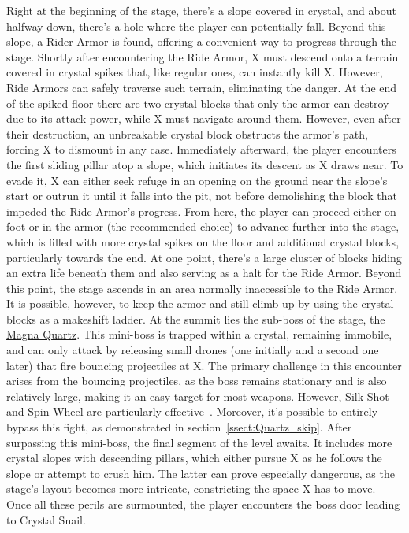 Right at the beginning of the stage, there's a slope covered in crystal, and about halfway down, there's a hole where the player can potentially fall. Beyond this slope, a Rider Armor is found, offering a convenient way to progress through the stage. Shortly after encountering the Ride Armor, X must descend onto a terrain covered in crystal spikes that, like regular ones, can instantly kill X. However, Ride Armors can safely traverse such terrain, eliminating the danger. At the end of the spiked floor there are two crystal blocks that only the armor can destroy due to its attack power, while X must navigate around them. However, even after their destruction, an unbreakable crystal block obstructs the armor's path, forcing X to dismount in any case. Immediately afterward, the player encounters the first sliding pillar atop a slope, which initiates its descent as X draws near. To evade it, X can either seek refuge in an opening on the ground near the slope's start or outrun it until it falls into the pit, not before demolishing the block that impeded the Ride Armor's progress. From here, the player can proceed either on foot or in the armor (the recommended choice) to advance further into the stage, which is filled with more crystal spikes on the floor and additional crystal blocks, particularly towards the end. At one point, there's a large cluster of blocks hiding an extra life beneath them and also serving as a halt for the Ride Armor. Beyond this point, the stage ascends in an area normally inaccessible to the Ride Armor. It is possible, however, to keep the armor and still climb up by using the crystal blocks as a makeshift ladder. At the summit lies the sub-boss of the stage, the \hyperlink{miniboss:Magna_Quartz}{Magna Quartz}. This mini-boss is trapped within a crystal, remaining immobile, and can only attack by releasing small drones (one initially and a second one later) that fire bouncing projectiles at X. The primary challenge in this encounter arises from the bouncing projectiles, as the boss remains stationary and is also relatively large, making it an easy target for most weapons. However, Silk Shot and Spin Wheel are particularly effective~\cite{wiki:Magna_quartz}. Moreover, it's possible to entirely bypass this fight, as demonstrated in section~\ref{ssect:Quartz_skip}. After surpassing this mini-boss, the final segment of the level awaits. It includes more crystal slopes with descending pillars, which either pursue X as he follows the slope or attempt to crush him. The latter can prove especially dangerous, as the stage's layout becomes more intricate, constricting the space X has to move. Once all these perils are surmounted, the player encounters the boss door leading to Crystal Snail.

